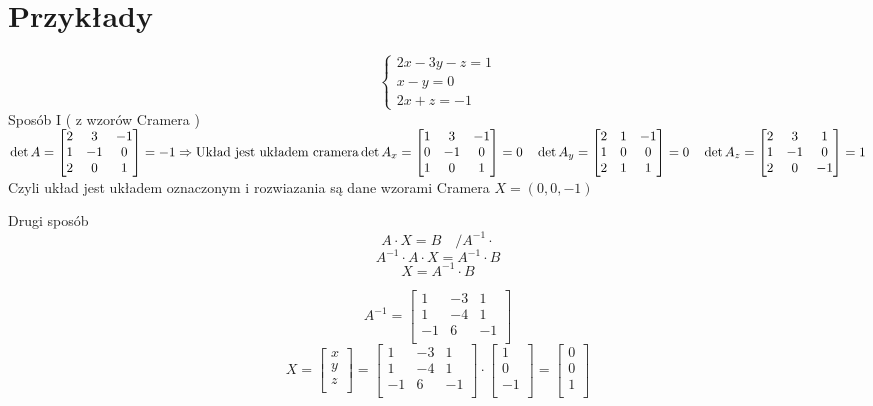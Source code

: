 \documentclass[11pt]{article}
\begin{document}
\section{Przykłady}
$$ \begin{cases} 2x - 3y - z = 1 \\ x - y = 0 \\ 2x + z = - 1\end{cases}$$
Sposób I ( z wzorów Cramera )
$ \det{A} = \begin{bmatrix}
	2 & 3 & -1\\
	1 & -1 & 0\\
	2 & 0 & 1\\
\end{bmatrix}= -1 \Rightarrow \hbox{Układ jest układem cramera} \\ \det{A_x} = \begin{bmatrix}
	1 & 3 & -1\\
	0 & -1 & 0\\
	1 & 0 & 1\\
\end{bmatrix} = 0 \quad \det{A_y} = \begin{bmatrix}
	2 & 1 & -1\\
	1 & 0 & 0\\
	2 & 1 & 1\\
\end{bmatrix} = 0 \quad \det{A_z} =\begin{bmatrix}
	2 & 3 & 1\\
	1 & -1 & 0\\
	2 & 0 & -1\\
\end{bmatrix} = 1$
Czyli układ jest układem oznaczonym i rozwiazania są dane wzorami Cramera $ X = (0 , 0 , -1) $

Drugi sposób
$$ A \cdot X = B \quad/ A^{-1} \cdot $$
$$ A^{-1} \cdot A \cdot X = A^{-1} \cdot B $$
$$ X = A^{-1}\cdot B$$

$$ A^{-1}=\begin{bmatrix}
	1 & -3 & 1\\
	1 & -4 & 1\\
	-1 & 6 & -1\\
\end{bmatrix}$$
$$ X = \begin{bmatrix}
	x\\
	y\\
	z\\
\end{bmatrix} = \begin{bmatrix}
	1 & -3 & 1\\
	1 & -4 & 1\\
	-1 & 6 & -1\\
\end{bmatrix}\cdot \begin{bmatrix}
	1\\
	0\\
	-1\\
\end{bmatrix} = \begin{bmatrix}
	0\\
	0\\
	1\\
\end{bmatrix} $$
\end{document}
